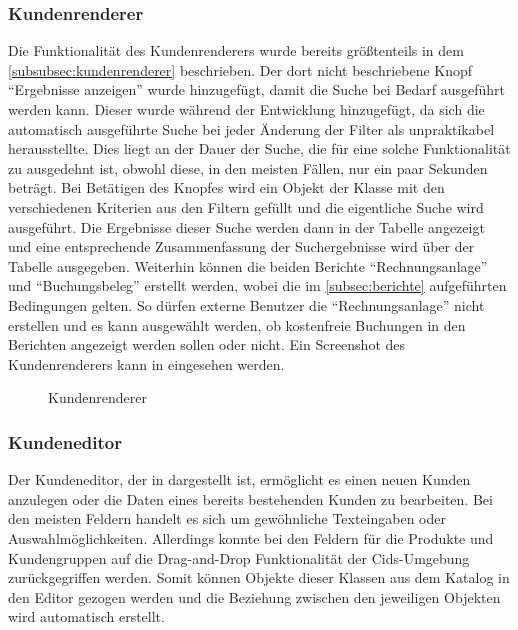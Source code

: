\subsubsection{Kundenrenderer}
Die Funktionalität des Kundenrenderers wurde bereits größtenteils in dem \autoref{subsubsec:kundenrenderer} beschrieben.
Der dort nicht beschriebene Knopf "`Ergebnisse anzeigen"' wurde hinzugefügt, damit die Suche bei Bedarf ausgeführt werden kann.
Dieser wurde während der Entwicklung hinzugefügt, da sich die automatisch ausgeführte Suche bei jeder Änderung der Filter als unpraktikabel herausstellte.
Dies liegt an der Dauer der Suche, die für eine solche Funktionalität zu ausgedehnt ist, obwohl diese, in den meisten Fällen, nur ein paar Sekunden beträgt.
Bei Betätigen des Knopfes wird ein Objekt der Klasse  mit den verschiedenen Kriterien aus den Filtern gefüllt und die eigentliche Suche wird ausgeführt.
Die Ergebnisse dieser Suche werden dann in der Tabelle angezeigt und eine entsprechende Zusammenfassung der Suchergebnisse wird über der Tabelle ausgegeben.
Weiterhin können die beiden Berichte \enquote{Rechnungsanlage} und \enquote{Buchungsbeleg} erstellt werden, wobei die im \autoref{subsec:berichte} aufgeführten Bedingungen gelten.
So dürfen externe Benutzer die \enquote{Rechnungsanlage} nicht erstellen und es kann ausgewählt werden, ob kostenfreie Buchungen in den Berichten angezeigt werden sollen oder nicht.
Ein Screenshot des Kundenrenderers kann in  eingesehen werden.

\begin{figure}[htb]
	\centering
	\caption{Kundenrenderer}
	\label{fig:kundenrenderer}
\end{figure}
\subsubsection{Kundeneditor}
Der Kundeneditor, der in  dargestellt ist, ermöglicht es einen neuen Kunden anzulegen oder die Daten eines bereits bestehenden Kunden zu bearbeiten.
Bei den meisten Feldern handelt es sich um gewöhnliche Texteingaben oder Auswahlmöglichkeiten.
Allerdings konnte bei den Feldern für die Produkte und Kundengruppen auf die Drag-and-Drop Funktionalität der Cids-Umgebung zurückgegriffen werden.
Somit können Objekte dieser Klassen aus dem Katalog in den Editor gezogen werden und die Beziehung zwischen den jeweiligen Objekten wird automatisch erstellt.

